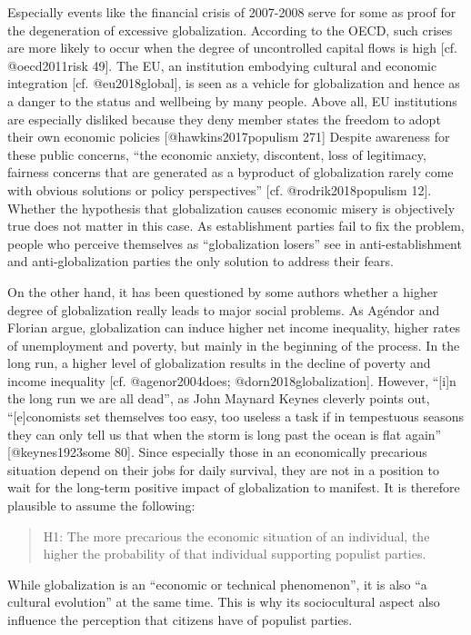\documentclass[]{article}
\begin{document}
Especially events like the financial crisis of 2007-2008 serve for some
as proof for the degeneration of excessive globalization. According to
the OECD, such crises are more likely to occur when the degree of
uncontrolled capital flows is high {[}cf. @oecd2011risk 49{]}. The EU,
an institution embodying cultural and economic integration {[}cf.
@eu2018global{]}, is seen as a vehicle for globalization and hence as a
danger to the status and wellbeing by many people. Above all, EU
institutions are especially disliked because they deny member states the
freedom to adopt their own economic policies {[}@hawkins2017populism
271{]} Despite awareness for these public concerns, ``the economic
anxiety, discontent, loss of legitimacy, fairness concerns that are
generated as a byproduct of globalization rarely come with obvious
solutions or policy perspectives'' {[}cf. @rodrik2018populism 12{]}.
Whether the hypothesis that globalization causes economic misery is
objectively true does not matter in this case. As establishment parties
fail to fix the problem, people who perceive themselves as
``globalization losers'' see in anti-establishment and
anti-globalization parties the only solution to address their fears.

On the other hand, it has been questioned by some authors whether a
higher degree of globalization really leads to major social problems. As
Agéndor and Florian argue, globalization can induce higher net income
inequality, higher rates of unemployment and poverty, but mainly in the
beginning of the process. In the long run, a higher level of
globalization results in the decline of poverty and income inequality
{[}cf. @agenor2004does; @dorn2018globalization{]}. However, ``{[}i{]}n
the long run we are all dead'', as John Maynard Keynes cleverly points
out, ``{[}e{]}conomists set themselves too easy, too useless a task if
in tempestuous seasons they can only tell us that when the storm is long
past the ocean is flat again'' {[}@keynes1923some 80{]}. Since
especially those in an economically precarious situation depend on their
jobs for daily survival, they are not in a position to wait for the
long-term positive impact of globalization to manifest. It is therefore
plausible to assume the following:

\begin{quote}
H1: The more precarious the economic situation of an individual, the
higher the probability of that individual supporting populist parties.
\end{quote}

While globalization is an ``economic or technical phenomenon'', it is
also ``a cultural evolution'' at the same time. This is why its
sociocultural aspect also influence the perception that citizens have of
populist parties.
\end{document}
